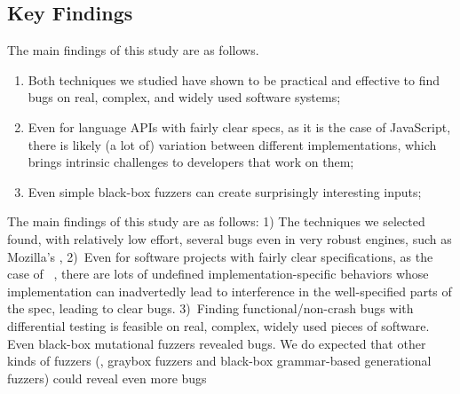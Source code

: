 \documentclass[smallextended]{svjour3}
\begin{document}

\subsection{Key Findings}
\label{sec:findings}

The main findings of this study are as follows.

\begin{enumerate}
  \item Both techniques we studied have shown to be practical and
    effective to find bugs on real, complex, and widely used software
    systems;
  \item Even for language APIs with fairly clear specs, as it is the
    case of JavaScript, there is likely (a lot of) variation between
    different implementations, which brings intrinsic challenges to
    developers that work on them;
  \item Even simple black-box fuzzers can create surprisingly
    interesting inputs;

\end{enumerate}


The main findings of this study are as follows: 1) The techniques we
selected found, with relatively low effort, several bugs even in very
robust engines, such as Mozilla's \smonkey, 2)~Even for software
projects with fairly clear specifications, as the case of
\javascript{}~\cite{ecmas262-spec}, there are lots of undefined
implementation-specific behaviors whose implementation can
inadvertedly lead to interference in the well-specified parts of the
spec, leading to clear bugs. 3)~Finding functional/non-crash bugs with
differential testing is feasible on real, complex, widely used pieces
of software. Even black-box mutational fuzzers revealed bugs. We do
expected that other kinds of fuzzers (\eg{}, graybox fuzzers and
black-box grammar-based generational fuzzers) could reveal even more
bugs
\end{document}
